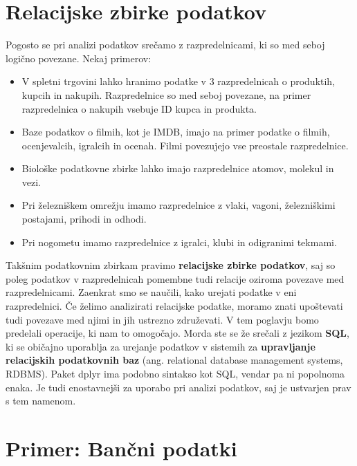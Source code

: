 \documentclass[
]{book}
\providecommand{\tightlist}{%
  \setlength{\itemsep}{0pt}\setlength{\parskip}{0pt}}
\begin{document}
\hypertarget{relacijske-zbirke-podatkov}{%
\section{Relacijske zbirke podatkov}\label{relacijske-zbirke-podatkov}}

Pogosto se pri analizi podatkov srečamo z razpredelnicami, ki so med seboj logično povezane. Nekaj primerov:

\begin{itemize}
\tightlist
\item
  V spletni trgovini lahko hranimo podatke v 3 razpredelnicah o produktih, kupcih in nakupih. Razpredelnice so med seboj povezane, na primer razpredelnica o nakupih vsebuje ID kupca in produkta.
\item
  Baze podatkov o filmih, kot je IMDB, imajo na primer podatke o filmih, ocenjevalcih, igralcih in ocenah. Filmi povezujejo vse preostale razpredelnice.
\item
  Biološke podatkovne zbirke lahko imajo razpredelnice atomov, molekul in vezi.
\item
  Pri železniškem omrežju imamo razpredelnice z vlaki, vagoni, železniškimi postajami, prihodi in odhodi.
\item
  Pri nogometu imamo razpredelnice z igralci, klubi in odigranimi tekmami.
\end{itemize}

Takšnim podatkovnim zbirkam pravimo \textbf{relacijske zbirke podatkov}, saj so poleg podatkov v razpredelnicah pomembne tudi relacije oziroma povezave med razpredelnicami. Zaenkrat smo se naučili, kako urejati podatke v eni razpredelnici. Če želimo analizirati relacijske podatke, moramo znati upoštevati tudi povezave med njimi in jih ustrezno združevati. V tem poglavju bomo predelali operacije, ki nam to omogočajo. Morda ste se že srečali z jezikom \textbf{SQL}, ki se običajno uporablja za urejanje podatkov v sistemih za \textbf{upravljanje relacijskih podatkovnih baz} (ang. relational database management systems, RDBMS). Paket dplyr ima podobno sintakso kot SQL, vendar pa ni popolnoma enaka. Je tudi enostavnejši za uporabo pri analizi podatkov, saj je ustvarjen prav s tem namenom.

\hypertarget{primer-banux10dni-podatki}{%
\section{Primer: Bančni podatki}\label{primer-banux10dni-podatki}}
\end{document}
